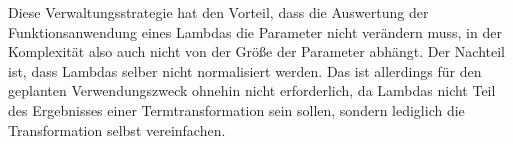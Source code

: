 Diese Verwaltungsstrategie hat den Vorteil, dass die Auswertung der Funktionsanwendung eines Lambdas die Parameter nicht verändern muss, in der Komplexität also auch nicht von der Größe der Parameter abhängt. Der Nachteil ist, dass Lambdas selber nicht normalisiert werden. Das ist allerdings für den geplanten Verwendungszweck ohnehin nicht erforderlich, da Lambdas nicht Teil des Ergebnisses einer Termtransformation sein sollen, sondern lediglich die Transformation selbst vereinfachen. 








